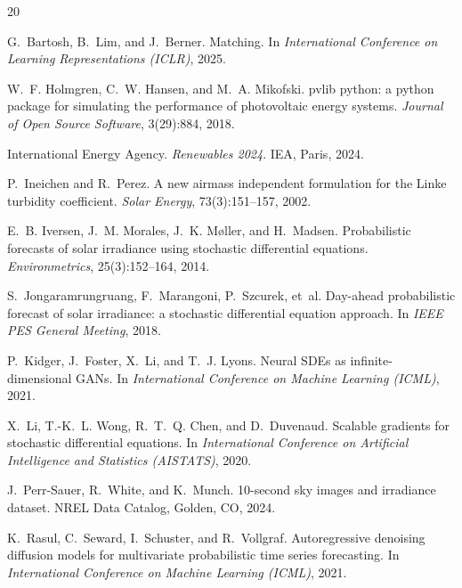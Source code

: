 \documentclass{article}
\begin{document}
\begin{thebibliography}{20}

G.~Bartosh, B.~Lim, and J.~Berner.
 Matching.
\newblock In \emph{International Conference on Learning Representations (ICLR)}, 2025.

W.~F. Holmgren, C.~W. Hansen, and M.~A. Mikofski.
\newblock pvlib python: a python package for simulating the performance of photovoltaic energy systems.
\newblock \emph{Journal of Open Source Software}, 3(29):884, 2018.

{International Energy Agency}.
\newblock \emph{Renewables 2024}.
\newblock IEA, Paris, 2024.

P.~Ineichen and R.~Perez.
\newblock A new airmass independent formulation for the {L}inke turbidity coefficient.
\newblock \emph{Solar Energy}, 73(3):151--157, 2002.

E.~B. Iversen, J.~M. Morales, J.~K. M{\o}ller, and H.~Madsen.
\newblock Probabilistic forecasts of solar irradiance using stochastic differential equations.
\newblock \emph{Environmetrics}, 25(3):152--164, 2014.

S.~Jongaramrungruang, F.~Marangoni, P.~Szcurek, et~al.
\newblock Day-ahead probabilistic forecast of solar irradiance: a stochastic differential equation approach.
\newblock In \emph{IEEE PES General Meeting}, 2018.

P.~Kidger, J.~Foster, X.~Li, and T.~J. Lyons.
\newblock Neural {SDE}s as infinite-dimensional {GAN}s.
\newblock In \emph{International Conference on Machine Learning (ICML)}, 2021.

X.~Li, T.-K.~L. Wong, R.~T.~Q. Chen, and D.~Duvenaud.
\newblock Scalable gradients for stochastic differential equations.
\newblock In \emph{International Conference on Artificial Intelligence and Statistics (AISTATS)}, 2020.

J.~Perr-Sauer, R.~White, and K.~Munch.
 10-second sky images and irradiance dataset.
\newblock NREL Data Catalog, Golden, CO, 2024.

K.~Rasul, C.~Seward, I.~Schuster, and R.~Vollgraf.
\newblock Autoregressive denoising diffusion models for multivariate probabilistic time series forecasting.
\newblock In \emph{International Conference on Machine Learning (ICML)}, 2021.


\end{thebibliography}
\end{document}
